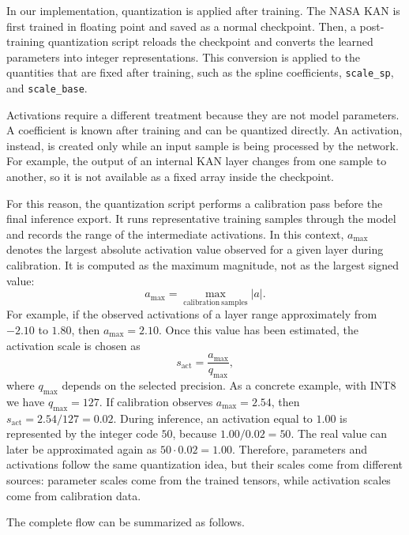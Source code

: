 \documentclass[11pt,a4paper]{article}
\begin{document}
In our implementation, quantization is applied after training.
The NASA KAN is first trained in floating point and saved as a normal checkpoint.
Then, a post-training quantization script reloads the checkpoint and converts the learned parameters into integer representations.
This conversion is applied to the quantities that are fixed after training, such as the spline coefficients, \texttt{scale\_sp}, and \texttt{scale\_base}.

Activations require a different treatment because they are not model parameters.
A coefficient is known after training and can be quantized directly.
An activation, instead, is created only while an input sample is being processed by the network.
For example, the output of an internal KAN layer changes from one sample to another, so it is not available as a fixed array inside the checkpoint.

For this reason, the quantization script performs a calibration pass before the final inference export.
It runs representative training samples through the model and records the range of the intermediate activations.
In this context, $a_{\max}$ denotes the largest absolute activation value observed for a given layer during calibration.
It is computed as the maximum magnitude, not as the largest signed value:
\begin{equation}
    a_{\max} =
    \max_{\mathrm{calibration}\ \mathrm{samples}} |a|.
\end{equation}
For example, if the observed activations of a layer range approximately from $-2.10$ to $1.80$, then $a_{\max}=2.10$.
Once this value has been estimated, the activation scale is chosen as
\begin{equation}
    s_{\mathrm{act}} =
    \frac{a_{\max}}{q_{\max}},
\end{equation}
where $q_{\max}$ depends on the selected precision.
As a concrete example, with INT8 we have $q_{\max}=127$.
If calibration observes $a_{\max}=2.54$, then $s_{\mathrm{act}}=2.54/127=0.02$.
During inference, an activation equal to $1.00$ is represented by the integer code $50$, because $1.00/0.02=50$.
The real value can later be approximated again as $50 \cdot 0.02 = 1.00$.
Therefore, parameters and activations follow the same quantization idea, but their scales come from different sources: parameter scales come from the trained tensors, while activation scales come from calibration data.

The complete flow can be summarized as follows.
\end{document}
